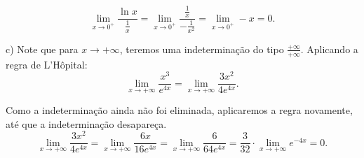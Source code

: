 \documentclass{article}
\begin{document}
{\begin{newpage}
\begin{equation*} \displaystyle{\lim_{x\to 0^{+}} \frac{\ln{x}}{\frac{1}{x}} = \lim_{x\to 0^{+}} \frac{\frac{1}{x}}{-\frac{1}{x^2}} = \lim_{x\to 0^{+}} -x = 0}.\end{equation*}
\par
\vspace{0.3cm}
c) Note que para $x\rightarrow +\infty $, teremos uma indeterminação do tipo $\frac{+\infty }{+\infty }$. Aplicando a regra de L'Hôpital:
\begin{equation*} \displaystyle{\lim_{x\to +\infty } \frac{x^3}{e^{4x}} = \lim_{x\to +\infty } \frac{3x^{2}}{4e^{4x}}}.\end{equation*}
\par Como a indeterminação ainda não foi eliminada, aplicaremos a regra novamente, até que a indeterminação desapareça.
\begin{equation*} \displaystyle{\lim_{x\to +\infty } \frac{3x^2}{4e^{4x}} = \lim_{x\to +\infty } \frac{6x}{16e^{4x}} = \lim_{x\to +\infty } \frac{6}{64e^{4x}} = \frac{3}{32}\cdot\lim_{x\to +\infty }e^{-4x} = 0. }\end{equation*}
\par
\vspace{0.3cm}

\end{newpage}}
\end{document}

